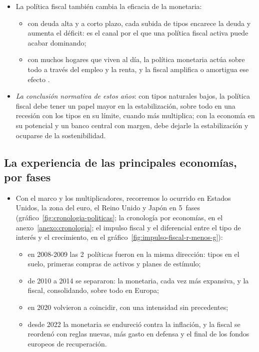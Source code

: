 \documentclass[11pt]{article}
\begin{document}
\begin{itemize}
\item La política fiscal también cambia la eficacia de la monetaria:
  \begin{itemize}
  \item con deuda alta y a corto plazo, cada subida de tipos encarece la deuda y aumenta el déficit: es el canal por el que una política fiscal activa puede acabar dominando;
  \item con muchos hogares que viven al día, la política monetaria actúa sobre todo a través del empleo y la renta, y la fiscal amplifica o amortigua ese efecto\nocite{KaplanMollViolante2018Monetary} .
  \end{itemize}
\item \emph{La conclusión normativa de estos años}: con tipos naturales bajos, la política fiscal debe tener un papel mayor en la estabilización, sobre todo en una recesión con los tipos en su límite, cuando más multiplica\nocite{BlanchardSummers2017Rethinking,Bernanke2020New}; con la economía en su potencial y un banco central con margen, debe dejarle la estabilización y ocuparse de la sostenibilidad.
\end{itemize}

\subsection{La experiencia de las principales economías, por fases}\label{sec:experiencia}

\begin{itemize}
\item Con el marco y los multiplicadores, recorremos lo ocurrido en Estados Unidos, la zona del euro, el Reino Unido y Japón en 5~fases (gráfico~\ref{fig:cronologia-politicas}; la cronología por economías, en el anexo~\ref{anexo:cronologia}; el impulso fiscal y el diferencial entre el tipo de interés y el crecimiento, en el gráfico~\ref{fig:impulso-fiscal-r-menos-g}):
  \begin{itemize}
  \item en 2008-2009 las 2~políticas fueron en la misma dirección: tipos en el suelo, primeras compras de activos y planes de estímulo;
  \item de 2010 a 2014 se separaron: la monetaria, cada vez más expansiva, y la fiscal, consolidando, sobre todo en Europa;
  \item en 2020 volvieron a coincidir, con una intensidad sin precedentes;
  \item desde 2022 la monetaria se endureció contra la inflación, y la fiscal se reordenó con reglas nuevas, más gasto en defensa y el final de los fondos europeos de recuperación.
  \end{itemize}
\end{itemize}
\end{document}
